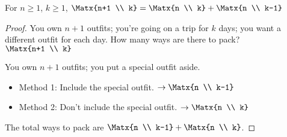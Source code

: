 \begin{example}
For $n \ge 1$, $k \ge 1$, $\Matx{n+1 \\ k} = \Matx{n \\ k} + \Matx{n \\ k-1}$
\end{example}
\begin{proof}
You own $n+1$ outfits; you're going on a trip for $k$ days; you want a different outfit for each day. How many ways are there to pack? $\Matx{n+1 \\ k}$

You own $n+1$ outfits; you put a special outfit aside. 
    \begin{itemize}
        \item Method 1: Include the special outfit. $\to \Matx{n \\ k-1}$
        \item Method 2: Don't include the special outfit. $\to \Matx{n \\ k}$
    \end{itemize}
The total ways to pack are $\Matx{n \\ k-1} + \Matx{n \\ k}$.
\end{proof}

